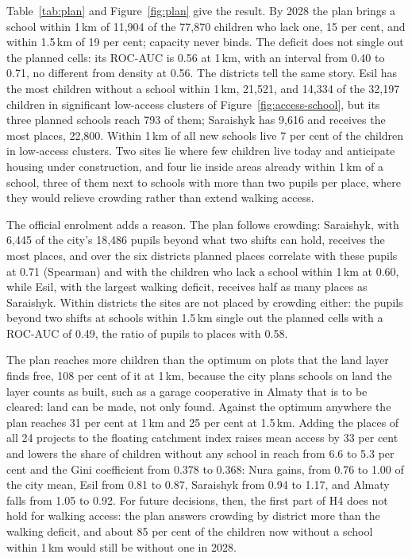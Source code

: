 Table~\ref{tab:plan} and Figure~\ref{fig:plan} give the result. By 2028 the plan brings a school within 1\,km of 11,904 of the 77,870 children who lack one, 15 per cent, and within 1.5\,km of 19 per cent; capacity never binds. The deficit does not single out the planned cells: its ROC-AUC is 0.56 at 1\,km, with an interval from 0.40 to 0.71, no different from density at 0.56. The districts tell the same story. Esil has the most children without a school within 1\,km, 21,521, and 14,334 of the 32,197 children in significant low-access clusters of Figure~\ref{fig:access-school}, but its three planned schools reach 793 of them; Saraishyk has 9,616 and receives the most places, 22,800. Within 1\,km of all new schools live 7 per cent of the children in low-access clusters. Two sites lie where few children live today and anticipate housing under construction, and four lie inside areas already within 1\,km of a school, three of them next to schools with more than two pupils per place, where they would relieve crowding rather than extend walking access.

The official enrolment adds a reason. The plan follows crowding: Saraishyk, with 6,445 of the city's 18,486 pupils beyond what two shifts can hold, receives the most places, and over the six districts planned places correlate with these pupils at 0.71 (Spearman) and with the children who lack a school within 1\,km at 0.60, while Esil, with the largest walking deficit, receives half as many places as Saraishyk. Within districts the sites are not placed by crowding either: the pupils beyond two shifts at schools within 1.5\,km single out the planned cells with a ROC-AUC of 0.49, the ratio of pupils to places with 0.58.

The plan reaches more children than the optimum on plots that the land layer finds free, 108 per cent of it at 1\,km, because the city plans schools on land the layer counts as built, such as a garage cooperative in Almaty that is to be cleared: land can be made, not only found. Against the optimum anywhere the plan reaches 31 per cent at 1\,km and 25 per cent at 1.5\,km. Adding the places of all 24 projects to the floating catchment index raises mean access by 33 per cent and lowers the share of children without any school in reach from 6.6 to 5.3 per cent and the Gini coefficient from 0.378 to 0.368: Nura gains, from 0.76 to 1.00 of the city mean, Esil from 0.81 to 0.87, Saraishyk from 0.94 to 1.17, and Almaty falls from 1.05 to 0.92. For future decisions, then, the first part of H4 does not hold for walking access: the plan answers crowding by district more than the walking deficit, and about 85 per cent of the children now without a school within 1\,km would still be without one in 2028.

